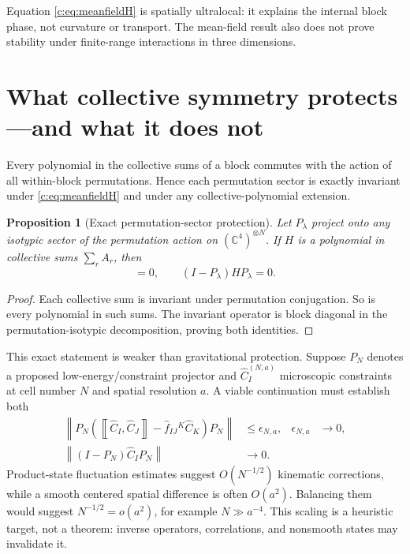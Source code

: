 \documentclass[11pt]{article}
\newtheorem{proposition}[theorem]{Proposition}
\theoremstyle{remark}\newtheorem{remark}[theorem]{Remark}
\newcommand{\Hbr}[2]{\left\llbracket #1,#2\right\rrbracket}
\begin{document}
Equation \eqref{c:eq:meanfieldH} is spatially ultralocal: it explains the internal block phase, not curvature or transport.  The mean-field result also does not prove stability under finite-range interactions in three dimensions.



\section{What collective symmetry protects---and what it does not}

Every polynomial in the collective sums of a block commutes with the action of all within-block permutations.  Hence each permutation sector is exactly invariant under \eqref{c:eq:meanfieldH} and under any collective-polynomial extension.

\begin{proposition}[Exact permutation-sector protection]\label{c:prop:perm}
Let $P_\lambda$ project onto any isotypic sector of the permutation action on $(\mathbb C^4)^{\otimes N}$.  If $H$ is a polynomial in collective sums $\sum_rA_r$, then
\begin{equation}
[H,P_\lambda]=0,\qquad (I-P_\lambda)HP_\lambda=0.
\end{equation}
\end{proposition}

\begin{proof}
Each collective sum is invariant under permutation conjugation.  So is every polynomial in such sums.  The invariant operator is block diagonal in the permutation-isotypic decomposition, proving both identities.
\end{proof}

This exact statement is weaker than gravitational protection.  Suppose $P_N$ denotes a proposed low-energy/constraint projector and $\widehat C_I^{(N,a)}$ microscopic constraints at cell number $N$ and spatial resolution $a$.  A viable continuation must establish both
\begin{align}
\left\|P_N\left(\Hbr{\widehat C_I}{\widehat C_J}
-\widehat f_{IJ}{}^K\widehat C_K\right)P_N\right\|&\leq\epsilon_{N,a},
&\epsilon_{N,a}&\longrightarrow0,\label{c:eq:closurebound}\\
\left\|(I-P_N)\widehat C_I P_N\right\|&\longrightarrow0.
\label{c:eq:leakage}
\end{align}
Product-state fluctuation estimates suggest $O(N^{-1/2})$ kinematic corrections, while a smooth centered spatial difference is often $O(a^2)$.  Balancing them would suggest $N^{-1/2}=o(a^2)$, for example $N\gg a^{-4}$.  This scaling is a heuristic target, not a theorem: inverse operators, correlations, and nonsmooth states may invalidate it.
\end{document}
